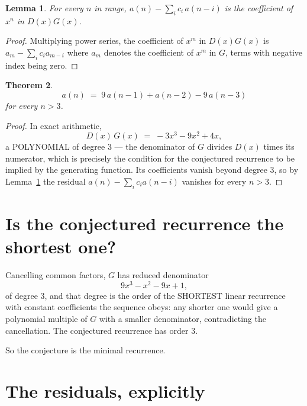 \documentclass[11pt,a4paper]{article}
\theoremstyle{plain}
\newtheorem{theorem}{Theorem}
\newtheorem{lemma}[theorem]{Lemma}
\theoremstyle{definition}
\begin{document}
\begin{lemma}\label{lem:key}
For every $n$ in range, $a(n)-\sum_i c_i\,a(n-i)$ is the coefficient of $x^{n}$ in
$D(x)G(x)$.
\end{lemma}

\begin{proof}
Multiplying power series, the coefficient of $x^{m}$ in $D(x)G(x)$ is
$a_m-\sum_i c_i a_{m-i}$ where $a_m$ denotes the coefficient of $x^{m}$ in $G$, terms with
negative index being zero.
\end{proof}

\begin{theorem}
\[
a(n)\;=\;9\,a(n-1) + a(n-2) - 9\,a(n-3)
\]
for every $n>3$.
\end{theorem}

\begin{proof}
In exact arithmetic,
\[
D(x)\,G(x)\;=\;- 3 x^{3} - 9 x^{2} + 4 x,
\]
a POLYNOMIAL of degree $3$ --- the denominator of $G$ divides $D(x)$ times its numerator,
which is precisely the condition for the conjectured recurrence to be implied by the
generating function. Its coefficients vanish beyond degree $3$, so by
Lemma~\ref{lem:key} the residual $a(n)-\sum_ic_ia(n-i)$ vanishes for every
$n>3$.
\end{proof}

\section{Is the conjectured recurrence the shortest one?}

Cancelling common factors, $G$ has reduced denominator
\[
9 x^{3} - x^{2} - 9 x + 1,
\]
of degree $3$, and that degree is the order of the SHORTEST linear recurrence with
constant coefficients the sequence obeys: any shorter one would give a polynomial multiple of
$G$ with a smaller denominator, contradicting the cancellation. The conjectured recurrence has
order $3$.

So the conjecture is the minimal recurrence.

\section{The residuals, explicitly}
\end{document}
